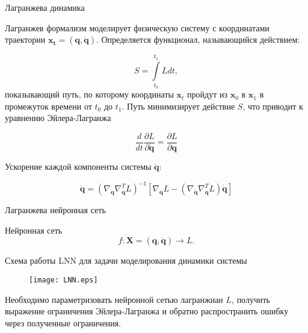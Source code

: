 \documentclass{beamer}
\begin{document}

\begin{frame}{Лагранжева динамика}

    Лагранжев формализм моделирует физическую систему с координатами траектории $\mathbf{x_t} = (\mathbf{q}, \dot{\mathbf{q}})$. Определяется функционал, называющийся действием:
    
    $$S=\int\limits_{t_0}^{t_1} L dt,$$
    показывающий путь, по которому координаты $\mathbf{x}_t$ пройдут из $\mathbf{x}_0$ в $\mathbf{x}_1$ в промежуток времени от $t_0$ до $t_1$. Путь минимизирует действие $S$, что приводит к уравнению Эйлера-Лагранжа

    $$\frac{d}{dt} \frac{\partial L}{\partial \dot{\mathbf{q}}} = \frac{\partial L}{\partial \mathbf{q}}$$

    Ускорение каждой компоненты системы $ \ddot{\mathbf{q}}$:

    $$\ddot{\mathbf{q}} = \left( \nabla_{\dot{\mathbf{q}}} \nabla_{\dot{\mathbf{q}}}^T L \right)^{-1} \left[ \nabla_{\mathbf{q}} L - \left( \nabla_{\dot{\mathbf{q}}} \nabla_{\mathbf{q}}^T L \right) \dot{\mathbf{q}} \right]$$


\end{frame}


\begin{frame}{Лагранжева нейронная сеть}

        Нейронная сеть
        $$f: \mathbf{X} = (\mathbf{q}, \mathbf{\dot{q}}) \rightarrow L.$$

        Схема работы LNN для задачи моделирования динамики системы

        \begin{figure}[H]
            \centering
            \texttt{[image: LNN.eps]}
        \end{figure}

        Необходимо параметризовать нейронной сетью лагранжиан $L$, получить выражение ограничения Эйлера-Лагранжа и обратно распространить ошибку через полученные ограничения.
    
\end{frame}

\end{document}

